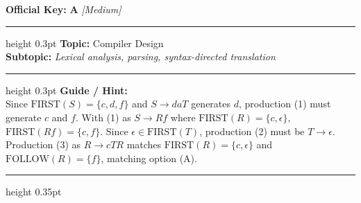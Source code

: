 \documentclass[a4paper,10pt]{article}
\begin{document}
\begin{tcolorbox}
\textbf{Official Key:} \textbf{\large A} \hfill \textit{\small [Medium]}
\vspace{2pt}\hrule height 0.3pt\vspace{3pt}
\textbf{Topic:} Compiler Design \\
\textbf{Subtopic:} \textit{Lexical analysis, parsing, syntax-directed translation}
\vspace{2pt}\hrule height 0.3pt\vspace{3pt}
\textbf{Guide / Hint:} \\
{\small Since $\text{FIRST}(S) = \{c, d, f\}$ and $S \to daT$ generates $d$, production (1) must generate $c$ and $f$. With (1) as $S \to Rf$ where $\text{FIRST}(R) = \{c, \epsilon\}$, $\text{FIRST}(Rf) = \{c, f\}$. Since $\epsilon \in \text{FIRST}(T)$, production (2) must be $T \to \epsilon$. Production (3) as $R \to cTR$ matches $\text{FIRST}(R) = \{c, \epsilon\}$ and $\text{FOLLOW}(R) = \{f\}$, matching option (A).}

\end{tcolorbox}
\vspace{6pt}\hrule height 0.35pt\vspace{6pt}
\noindent
\end{document}
